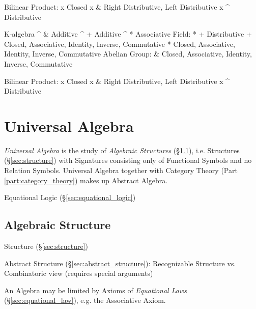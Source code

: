             Bilinear
            Product:
                      x Closed
                    x & Right Distributive, Left Distributive
                    x ^ Distributive

    K-algebra
                    ^ & Additive
                    ^ + Additive
                    ^ * Associative
             Field: * + Distributive
                      + Closed, Associative, Identity, Inverse, Commutative
                      * Closed, Associative, Identity, Inverse, Commutative
            Abelian
             Group:   & Closed, Associative, Identity, Inverse, Commutative

            Bilinear
            Product:
                      x Closed
                    x & Right Distributive, Left Distributive
                    x ^ Distributive


\fi


\section{Universal Algebra}\label{sec:universal_algebra}

\emph{Universal Algebra} is the study of \emph{Algebraic Structures}
(\S\ref{sec:algebraic_structure}), i.e. Structures
(\S\ref{sec:structure}) with Signatures consisting only of Functional
Symbols and no Relation Symbols. Universal Algebra together with
Category Theory (Part \ref{part:category_theory}) makes up Abstract
Algebra.

Equational Logic (\S\ref{sec:equational_logic})



\subsection{Algebraic Structure}\label{sec:algebraic_structure}

Structure (\S\ref{sec:structure})

Abstract Structure (\S\ref{sec:abstract_structure}): Recognizable
Structure vs. Combinatoric view (requires special arguments)

An Algebra may be limited by Axioms of \emph{Equational Laws}
(\S\ref{sec:equational_law}), e.g. the Associative Axiom.

